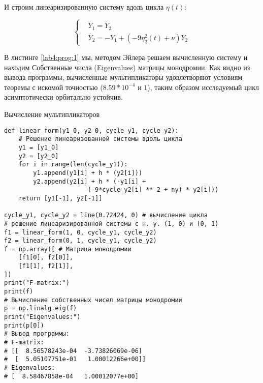 И строим линеаризированную систему вдоль цикла $\eta(t)$:

\begin{equation}\label{lab4:eq:3}
    \begin{cases}
        &\dot{Y_1} = Y_2 \\
        &\dot{Y_2} = -Y_1 + (-9\eta_2^2(t) + \nu)Y_2
    \end{cases}
\end{equation}

В листинге \ref{lab4:prog:1} мы, методом Эйлера решаем вычисленную систему
и находим Собственные числа (Eigenvalues) матрицы монодромии.
Как видно из вывода программы, вычисленные мультипликаторы удовлетворяют
условиям теоремы с искомой точностью ($8.59 * 10^{-4}$ и $1$),
таким образом исследуемый цикл асимптотически орбитально устойчив.

\begin{program}
    \caption{Вычисление мультипликаторов}
    \label{lab4:prog:1}
    \begin{verbatim}
def linear_form(y1_0, y2_0, cycle_y1, cycle_y2):
    # Решение линеаризованной системы вдоль цикла
    y1 = [y1_0]
    y2 = [y2_0]
    for i in range(len(cycle_y1)):
        y1.append(y1[i] + h * (y2[i]))
        y2.append(y2[i] + h * (-y1[i] +
                       (-9*cycle_y2[i] ** 2 + ny) * y2[i]))
    return [y1[-1], y2[-1]]

cycle_y1, cycle_y2 = line(0.72424, 0) # вычисление цикла
# решение линеаризированной системы с н. у. (1, 0) и (0, 1)
f1 = linear_form(1, 0, cycle_y1, cycle_y2)
f2 = linear_form(0, 1, cycle_y1, cycle_y2)
f = np.array([ # Матрица монодромии
    [f1[0], f2[0]],
    [f1[1], f2[1]],
])
print("F-matrix:")
print(f)
# Вычисление собственных чисел матрицы монодромии
p = np.linalg.eig(f)
print("Eigenvalues:")
print(p[0])
# Вывод программы:
# F-matrix:
# [[  8.56578243e-04  -3.73826069e-06]
#  [  5.05107751e-01   1.00012266e+00]]
# Eigenvalues:
# [  8.58467858e-04   1.00012077e+00]
    \end{verbatim}
\end{program}